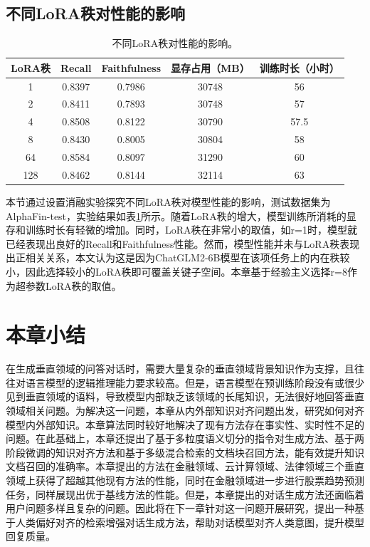 \subsection{不同LoRA秩对性能的影响}

\begin{table}
	\caption{\label{lora_rank_ablation}不同LoRA秩对性能的影响。}
	\centering{}%
	\small
	\begin{tabular}{ccccc}
		\toprule[2pt]
		LoRA秩 & Recall & Faithfulness & 显存占用（MB） & 训练时长（小时） \\
		\hline
		1 & 0.8397 & 0.7986 & 30748 & 56 \\
		2 & 0.8411 & 0.7893 & 30748 & 57 \\
		4 & 0.8508 & 0.8122 & 30790 & 57.5 \\
		8 & 0.8430 & 0.8005 & 30804 & 58 \\
		64 & 0.8584 & 0.8097 & 31290 & 60 \\
		128 & 0.8462 & 0.8144 & 32114 & 63 \\
		\bottomrule[2pt]
	\end{tabular}
\end{table}

本节通过设置消融实验探究不同LoRA秩对模型性能的影响，测试数据集为AlphaFin-test，实验结果如表\ref{lora_rank_ablation}所示。随着LoRA秩的增大，模型训练所消耗的显存和训练时长有轻微的增加。同时，LoRA秩在非常小的取值，如r=1时，模型就已经表现出良好的Recall和Faithfulness性能。然而，模型性能并未与LoRA秩表现出正相关关系，本文认为这是因为ChatGLM2-6B模型在该项任务上的内在秩较小，因此选择较小的LoRA秩即可覆盖关键子空间。本章基于经验主义选择r=8作为超参数LoRA秩的取值。

\section{本章小结}

在生成垂直领域的问答对话时，需要大量复杂的垂直领域背景知识作为支撑，且往往对语言模型的逻辑推理能力要求较高。但是，语言模型在预训练阶段没有或很少见到垂直领域的语料，导致模型内部缺乏该领域的长尾知识，无法很好地回答垂直领域相关问题。为解决这一问题，本章从内外部知识对齐问题出发，研究如何对齐模型内外部知识。本章算法同时较好地解决了现有方法存在事实性、实时性不足的问题。在此基础上，本章还提出了基于多粒度语义切分的指令对生成方法、基于两阶段微调的知识对齐方法和基于多级混合检索的文档块召回方法，能有效提升知识文档召回的准确率。本章提出的方法在金融领域、云计算领域、法律领域三个垂直领域上获得了超越其他现有方法的性能，同时在金融领域进一步进行股票趋势预测任务，同样展现出优于基线方法的性能。但是，本章提出的对话生成方法还面临着用户问题多样且复杂的问题。因此将在下一章针对这一问题开展研究，提出一种基于人类偏好对齐的检索增强对话生成方法，帮助对话模型对齐人类意图，提升模型回复质量。